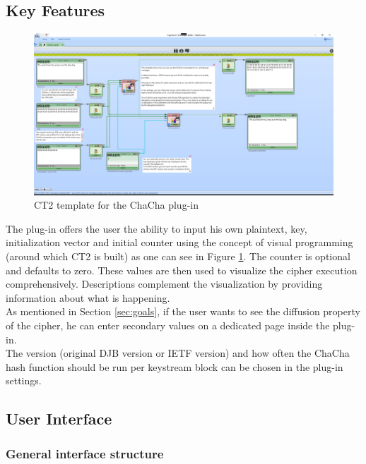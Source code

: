 
\subsection{Key Features}
\label{sec:keyFeatures}

\begin{figure}
\centering
\includegraphics[width=\textwidth]{figures/ct2/plugin-template.png}
\caption[ChaCha CT2 template]{CT2 template for the ChaCha plug-in}
\label{fig:plugin.template}
\end{figure}

The plug-in offers the user the ability to input his own plaintext, key, initialization vector and initial counter using the concept of visual programming (around which CT2 is built) as one can see in Figure \ref{fig:plugin.template}. The counter is optional and defaults to zero. These values are then used to visualize the cipher execution comprehensively. Descriptions complement the visualization by providing information about what is happening. \\
As mentioned in Section \ref{sec:goals}, if the user wants to see the diffusion property of the cipher, he can enter secondary values on a dedicated page inside the plug-in. \\
The version (original DJB version or IETF version) and how often the ChaCha hash function should be run per keystream block can be chosen in the plug-in settings.

\subsection{User Interface}
\label{sec:userInterface}

\subsubsection{General interface structure}

